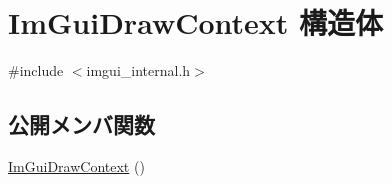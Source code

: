 \hypertarget{struct_im_gui_draw_context}{}\section{Im\+Gui\+Draw\+Context 構造体}
\label{struct_im_gui_draw_context}


{\ttfamily \#include $<$imgui\+\_\+internal.\+h$>$}

\subsection*{公開メンバ関数}
\begin{DoxyCompactItemize}
\item 
\mbox{\hyperlink{struct_im_gui_draw_context_a0bd8a456860aee49497c58c82a01600c}{Im\+Gui\+Draw\+Context}} ()
\end{DoxyCompactItemize}
